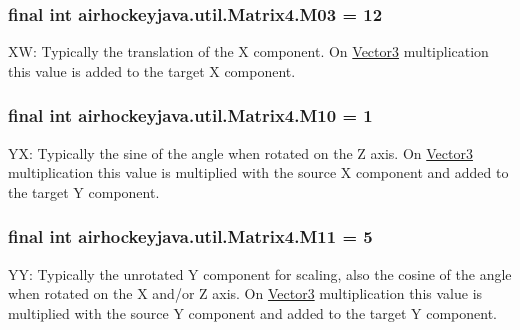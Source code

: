 \subsubsection[{M03}]{\setlength{\rightskip}{0pt plus 5cm}final int airhockeyjava.\+util.\+Matrix4.\+M03 = 12\hspace{0.3cm}{\ttfamily [static]}}\label{classairhockeyjava_1_1util_1_1_matrix4_a0da4a8966b37ffa3f11a1a7a7c52feea}
X\+W\+: Typically the translation of the X component. On \hyperlink{classairhockeyjava_1_1util_1_1_vector3}{Vector3} multiplication this value is added to the target X component. \hypertarget{classairhockeyjava_1_1util_1_1_matrix4_a68186877c2b74764b003a59eee8211be}{}
\subsubsection[{M10}]{\setlength{\rightskip}{0pt plus 5cm}final int airhockeyjava.\+util.\+Matrix4.\+M10 = 1\hspace{0.3cm}{\ttfamily [static]}}\label{classairhockeyjava_1_1util_1_1_matrix4_a68186877c2b74764b003a59eee8211be}
Y\+X\+: Typically the sine of the angle when rotated on the Z axis. On \hyperlink{classairhockeyjava_1_1util_1_1_vector3}{Vector3} multiplication this value is multiplied with the source X component and added to the target Y component. \hypertarget{classairhockeyjava_1_1util_1_1_matrix4_a63bab06f0c9bf49908c435800cd352c0}{}
\subsubsection[{M11}]{\setlength{\rightskip}{0pt plus 5cm}final int airhockeyjava.\+util.\+Matrix4.\+M11 = 5\hspace{0.3cm}{\ttfamily [static]}}\label{classairhockeyjava_1_1util_1_1_matrix4_a63bab06f0c9bf49908c435800cd352c0}
Y\+Y\+: Typically the unrotated Y component for scaling, also the cosine of the angle when rotated on the X and/or Z axis. On \hyperlink{classairhockeyjava_1_1util_1_1_vector3}{Vector3} multiplication this value is multiplied with the source Y component and added to the target Y component. \hypertarget{classairhockeyjava_1_1util_1_1_matrix4_a9b1b021afa2c59e3fc33c40640407d3c}{}

